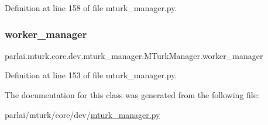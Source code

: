 Definition at line 158 of file mturk\+\_\+manager.\+py.

\mbox{\label{classparlai_1_1mturk_1_1core_1_1dev_1_1mturk__manager_1_1MTurkManager_a98d0b4e2a5ee84e5578412a53f2526b7}} 
\subsubsection{\texorpdfstring{worker\+\_\+manager}{worker\_manager}}
{\footnotesize\ttfamily parlai.\+mturk.\+core.\+dev.\+mturk\+\_\+manager.\+M\+Turk\+Manager.\+worker\+\_\+manager}



Definition at line 153 of file mturk\+\_\+manager.\+py.



The documentation for this class was generated from the following file\+:\begin{DoxyCompactItemize}
\item 
parlai/mturk/core/dev/\hyperlink{dev_2mturk__manager_8py}{mturk\+\_\+manager.\+py}\end{DoxyCompactItemize}
